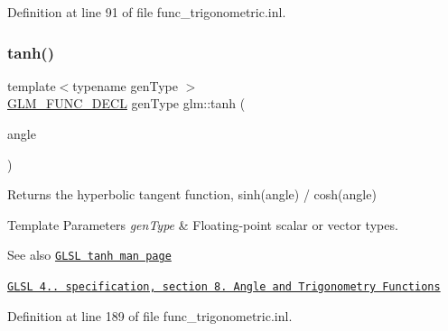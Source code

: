 Definition at line 91 of file func\+\_\+trigonometric.\+inl.

\mbox{\label{group__core__func__trigonometric_ga941f20e5315113d1a2e037f073a62f04}} 
\subsubsection{\texorpdfstring{tanh()}{tanh()}}
{\footnotesize\ttfamily template$<$typename gen\+Type $>$ \\
\hyperlink{setup_8hpp_ab2d052de21a70539923e9bcbf6e83a51}{G\+L\+M\+\_\+\+F\+U\+N\+C\+\_\+\+D\+E\+CL} gen\+Type glm\+::tanh (\begin{DoxyParamCaption}\item[{gen\+Type const \&}]{angle }\end{DoxyParamCaption})}

Returns the hyperbolic tangent function, sinh(angle) / cosh(angle)


\begin{DoxyTemplParams}{Template Parameters}
{\em gen\+Type} & Floating-\/point scalar or vector types.\\
\hline
\end{DoxyTemplParams}
\begin{DoxySeeAlso}{See also}
\href{http://www.opengl.org/sdk/docs/manglsl/xhtml/tanh.xml}{\tt G\+L\+SL tanh man page} 

\href{http://www.opengl.org/registry/doc/GLSLangSpec.4.20.8.pdf}{\tt G\+L\+SL 4.. specification, section 8. Angle and Trigonometry Functions} 
\end{DoxySeeAlso}


Definition at line 189 of file func\+\_\+trigonometric.\+inl.

